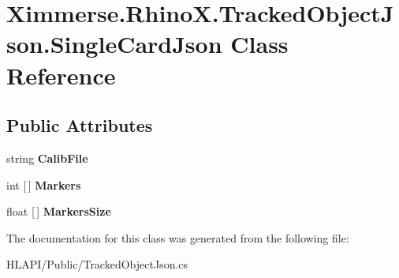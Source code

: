 \hypertarget{class_ximmerse_1_1_rhino_x_1_1_tracked_object_json_1_1_single_card_json}{}\section{Ximmerse.\+Rhino\+X.\+Tracked\+Object\+Json.\+Single\+Card\+Json Class Reference}
\label{class_ximmerse_1_1_rhino_x_1_1_tracked_object_json_1_1_single_card_json}
\subsection*{Public Attributes}
\begin{DoxyCompactItemize}
\item 
\mbox{\label{class_ximmerse_1_1_rhino_x_1_1_tracked_object_json_1_1_single_card_json_a9aef6e07c7e7e406f6a065126c8c393f}} 
string {\bfseries Calib\+File}
\item 
\mbox{\label{class_ximmerse_1_1_rhino_x_1_1_tracked_object_json_1_1_single_card_json_a90f40e3af9ed6640a155e9f98d9865fa}} 
int \mbox{[}$\,$\mbox{]} {\bfseries Markers}
\item 
\mbox{\label{class_ximmerse_1_1_rhino_x_1_1_tracked_object_json_1_1_single_card_json_a989379cc26e8ecf8da262c5bc8890141}} 
float \mbox{[}$\,$\mbox{]} {\bfseries Markers\+Size}
\end{DoxyCompactItemize}


The documentation for this class was generated from the following file\+:\begin{DoxyCompactItemize}
\item 
H\+L\+A\+P\+I/\+Public/Tracked\+Object\+Json.\+cs\end{DoxyCompactItemize}
